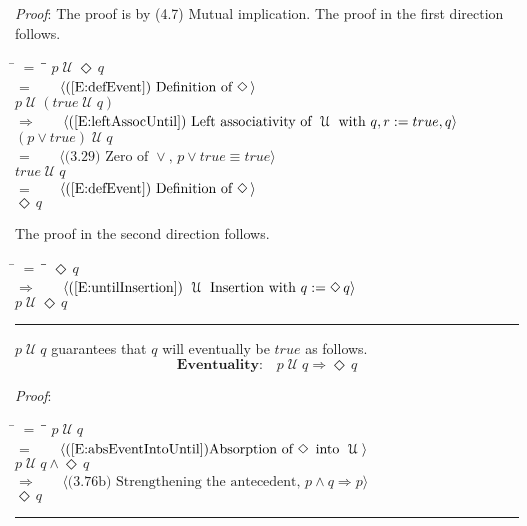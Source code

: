 \documentclass[12pt, fleqn, leqno]{article}
\newcommand{\lgap}{2pt}                             %
\newcommand{\mymathindent}{24pt}                    %
\newcommand{\impl}{\ensuremath{\Rightarrow}}        %
\newcommand{\Until}{\;\mathcal{U}\;}
\newcommand{\Event}{\Diamond\,}
\newcommand{\myqed}{\rule[-.23ex]{1.2ex}{2.0ex}}
\newcommand{\myqedtab}{\hspace{384pt}}              %
\newcommand{\Gll} {\langle}                         %
\newcommand{\Ggg} {\rangle}                         %
\newcommand{\Hint}[1]     {\ \ \ $\Gll              \mbox{#1} \Ggg$ }   %
\begin{document}
\emph{Proof}: The proof is by (4.7) Mutual implication.
The proof in the first direction follows.
\begin{tabbing}
\hspace{\mymathindent} \= $= \;$ \= \myqedtab \= \kill
\> \> $p \Until \Event q$\\[\lgap]
\> $=$ \> \Hint{(\ref{E:defEvent}) Definition of $\Event$} \\[\lgap]
\>\> $p \Until (true \Until q)$\\[\lgap]
\> $\impl$ \> \Hint{(\ref{E:leftAssocUntil}) Left associativity of $\Until$ with $q,r := true,q$} \\[\lgap]
\> \> $(p \lor true) \Until q$\\[\lgap]
\> $=$ \> \Hint{(3.29) Zero of $\lor$, $p\lor true\equiv true$} \\[\lgap]
\> \> $true \Until q$\\[\lgap]
\> $=$ \> \Hint{(\ref{E:defEvent}) Definition of $\Event$} \\[\lgap]
\> \> $\Event q$

\end{tabbing}
The proof in the second direction follows.
\begin{tabbing}
\hspace{\mymathindent} \= $= \;$ \= \myqedtab \= \kill
\> \> $ \Event q$\\[\lgap]
\> $\impl$ \> \Hint{(\ref{E:untilInsertion}) $\Until$ Insertion with $q := \Event q$} \\[\lgap]
\> \> $p \Until \Event q$ \quad \myqed
\end{tabbing}

$p\Until q$ guarantees that $q$ will eventually be $true$ as follows.
\begin{equation}\label{E:eventuality}
\textbf{Eventuality:}\quad p \Until q \impl \Event q
\end{equation}

\emph{Proof}:
\begin{tabbing}
\hspace{\mymathindent} \= $= \;$ \= \myqedtab \= \kill
  \> \>   $p \Until q$\\[\lgap]
  \> $=$  \>  \Hint{(\ref{E:absEventIntoUntil})Absorption of $\Event$ into $\Until$}\\[\lgap]
  \> \>   $p \Until q \land \Event q$\\[\lgap]
  \> $\impl$  \>  \Hint{(3.76b) Strengthening the antecedent, $p\land q \impl p$}\\[\lgap]
  \> \>   $\Event q$ \quad \myqed
\end{tabbing}
\end{document}
